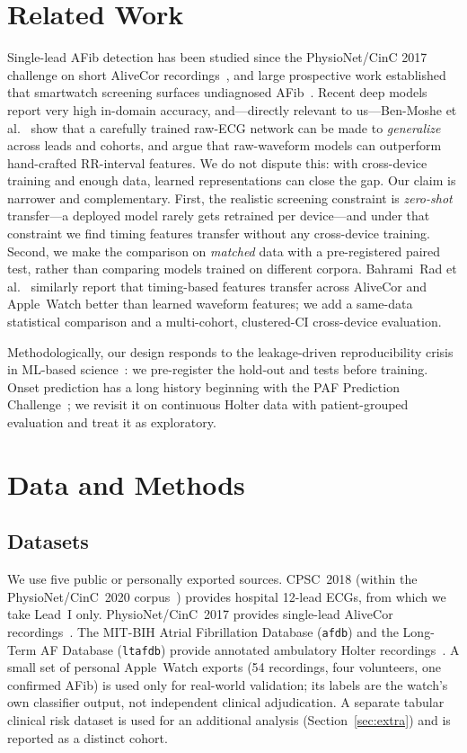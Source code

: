 \documentclass[]{ws-procs9x6}
\begin{document}
\section{Related Work}
Single-lead AFib detection has been studied since the PhysioNet/CinC 2017
challenge on short AliveCor recordings~\cite{clifford2017af}, and large
prospective work established that smartwatch screening surfaces undiagnosed
AFib~\cite{perez2019appleheart}. Recent deep models report very high in-domain
accuracy, and---directly relevant to us---Ben-Moshe et
al.~\cite{benmoshe2024rawecgnet} show that a carefully trained raw-ECG network can
be made to \emph{generalize} across leads and cohorts, and argue that raw-waveform
models can outperform hand-crafted RR-interval features. We do not dispute this:
with cross-device training and enough data, learned representations can close the
gap. Our claim is narrower and complementary. First, the realistic screening
constraint is \emph{zero-shot} transfer---a deployed model rarely gets retrained
per device---and under that constraint we find timing features transfer without
any cross-device training. Second, we make the comparison on \emph{matched} data
with a pre-registered paired test, rather than comparing models trained on
different corpora. Bahrami~Rad et al.~\cite{bahramirad2024crowdsourced} similarly
report that timing-based features transfer across AliveCor and Apple~Watch better
than learned waveform features; we add a same-data statistical comparison and a
multi-cohort, clustered-CI cross-device evaluation.

Methodologically, our design responds to the leakage-driven reproducibility
crisis in ML-based science~\cite{kapoor2023leakage}: we pre-register the hold-out
and tests before training. Onset prediction has a long history beginning with the
PAF Prediction Challenge~\cite{moody2001paf}; we revisit it on continuous Holter
data with patient-grouped evaluation and treat it as exploratory.

\section{Data and Methods}

\subsection{Datasets}
We use five public or personally exported sources. CPSC~2018 (within the
PhysioNet/CinC~2020 corpus~\cite{alday2020classification}) provides hospital
12-lead ECGs, from which we take Lead~I only. PhysioNet/CinC~2017 provides
single-lead AliveCor recordings~\cite{clifford2017af}. The MIT-BIH Atrial
Fibrillation Database (\texttt{afdb}) and the Long-Term AF Database
(\texttt{ltafdb}) provide annotated ambulatory Holter
recordings~\cite{moody1983afdb,petrutiu2007ltaf,goldberger2000physionet}. A small
set of personal Apple~Watch exports (54 recordings, four volunteers, one confirmed
AFib) is used only for real-world validation; its labels are the watch's own
classifier output, not independent clinical adjudication. A separate tabular
clinical risk dataset is used for an additional analysis (Section~\ref{sec:extra})
and is reported as a distinct cohort.
\end{document}
